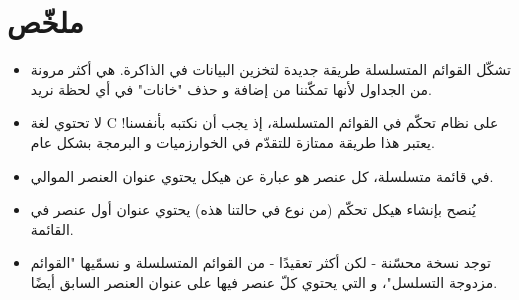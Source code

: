 \section*{ملخّص}

\begin{itemize}
	\item تشكّل القوائم المتسلسلة طريقة جديدة لتخزين البيانات في الذاكرة. هي أكثر مرونة من الجداول لأنها تمكّننا من إضافة و حذف "خانات" في أي لحظة نريد.
	\item لا تحتوي لغة \textenglish{C}
	على نظام تحكّم في القوائم المتسلسلة، إذ يجب أن نكتبه بأنفسنا! يعتبر هذا طريقة ممتازة للتقدّم في الخوارزميات و البرمجة بشكل عام.
	\item في قائمة متسلسلة، كل عنصر هو عبارة عن هيكل يحتوي عنوان العنصر الموالي.
	\item يُنصح بإنشاء هيكل تحكّم (من نوع
	في حالتنا هذه) يحتوي عنوان أول عنصر في القائمة.
	\item توجد نسخة محسّنة - لكن أكثر تعقيدًا - من القوائم المتسلسلة و نسمّيها "القوائم مزدوجة التسلسل"، و التي يحتوي كلّ عنصر فيها على عنوان العنصر السابق أيضًا.
\end{itemize}
